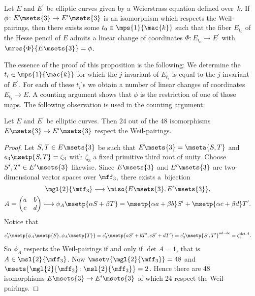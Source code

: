 \begin{Proposition}\label{hpga:prop:wprigepgl}\label{prop10} Let $E$ and $E^\prime$ be elliptic curves given by a Weierstrass equation defined over~$k$. If $\phi\colon E\msets{3}\rightarrow E^\prime\msets{3}$ is an isomorphism which respects the Weil-pairings, then there exists some $t_0\in\mps{1}{\mac {k}}$ such that the fiber $E_{t_0}$ of the Hesse pencil of $E$ admits a linear change of coordinates $\Phi\colon E_{t_0}\rightarrow E^\prime$ with $\mres{\Phi}{E\msets{3}}=\phi$.
\end{Proposition}

The essence of the proof of this proposition is the following: We determine the $t_i\in\mps{1}{\mac{k}}$ for which the $j$-invariant of $E_{t_i}$ is equal to the $j$-invariant of $E^\prime$. For each of these $t_i$'s we obtain a number of linear changes of coordinates $E_{t_i}\rightarrow E$. A counting argument shows that $\phi$ is the restriction of one of those maps. The following observation is used in the counting argument:

\begin{Lemma}\label{hpga:lem:cwpi} Let $E$ and $E^\prime$ be elliptic curves. Then $24$ out of the $48$ isomorphisms $E \msets{3}\rightarrow E^\prime\msets{3}$ respect the Weil-pairings.
\end{Lemma}
\begin{proof}Let $S,T\in E\msets{3}$ be such that $E\msets{3}=\mseta{S,T}$ and $e_3\msetp{S, T}=\zeta_3$ with $\zeta_3$ a fixed primitive third root of unity. Choose $S^\prime,T^\prime\in E^\prime\msets{3}$ likewise. Since $E\msets{3}$ and $E^\prime \msets{3}$ are two-dimensional vector spaces over $\mff_3$, there exists a~bijection
\begin{gather*}
\mgl{2}{\mff_3}\longrightarrow\miso{E\msets{3},E^\prime\msets{3}}, \\
A =\begin{pmatrix}a & b \\
c & d
\end{pmatrix}
\longmapsto \phi_A\msetp{\alpha S+\beta T} =\msetp{\alpha a+\beta b}S^\prime+\msetp{\alpha c+\beta d}T^\prime.
\end{gather*}
Notice that
\begin{gather*}
e_3^\prime\msetp{\phi_A\msetp{S},\phi_A\msetp{T}}=e_3^\prime\msetp{aS^\prime+bT^\prime,cS^\prime+dT^\prime} =e_3^\prime\msetp{S^\prime,T^\prime}^{ad-bc} =\zeta_3^{\det{A}}.
\end{gather*}
So $\phi_A$ respects the Weil-pairings if and only if $\det{A}=1$, that is $A\in \msl{2}{\mff_3}$. Now $\msetv{\mgl{2}{\mff_3}}=48$ and $\msets{\mgl{2}{\mff_3}\colon \msl{2}{\mff_3}}=2$. Hence there are 48 isomorphisms $E\msets{3}\rightarrow E^\prime\msets{3}$ of which 24 respect the Weil-pairings.
\end{proof}

